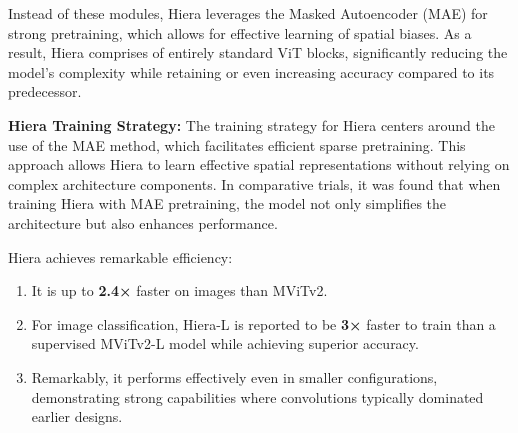 \documentclass{article} %
\begin{document}
Instead of these modules, Hiera leverages the Masked Autoencoder (MAE) for strong pretraining, which allows for effective learning of spatial biases. As a result, Hiera comprises of entirely standard ViT blocks, significantly reducing the model's complexity while retaining or even increasing accuracy compared to its predecessor.

{\bf Hiera Training Strategy:}
The training strategy for Hiera centers around the use of the MAE method, which facilitates efficient sparse pretraining. This approach allows Hiera to learn effective spatial representations without relying on complex architecture components. In comparative trials, it was found that when training Hiera with MAE pretraining, the model not only simplifies the architecture but also enhances performance.

Hiera achieves remarkable efficiency:
\begin{enumerate}
   \item It is up to {\bf 2.4×} faster on images than MViTv2.
   \item For image classification, Hiera-L is reported to be {\bf 3×} faster to train than a supervised MViTv2-L model while achieving superior accuracy.
   \item Remarkably, it performs effectively even in smaller configurations, demonstrating strong capabilities where convolutions typically dominated earlier designs.
\end{enumerate}
\end{document}
